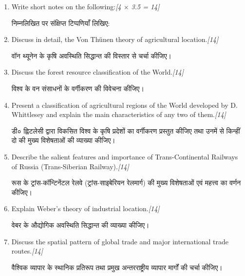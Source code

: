 \documentclass[11pt,a4paper]{article}
\newcommand{\pts}[1]{\hfill \textit{[#1]}}
\begin{document}
\begin{enumerate}[label=\textbf{\arabic*.},leftmargin=*,itemsep=14pt]

  \item Write short notes on the following:\pts{4 $\times$ 3.5 = 14}
  
  निम्नलिखित पर संक्षिप्त टिप्पणियाँ लिखिए:

  \item Discuss in detail, the Von Thünen theory of agricultural location.\pts{14}
  
  वॉन थ्यूनेन के कृषि अवस्थिति सिद्धान्त की विस्तार से चर्चा कीजिए।

  \item Discuss the forest resource classification of the World.\pts{14}
  
  विश्व के वन संसाधनों के वर्गीकरण की विवेचना कीजिए।

  \item Present a classification of agricultural regions of the World developed by D. Whittlesey and explain the main characteristics of any two of them.\pts{14}
  
  डी० ह्विटलेसी द्वारा विकसित विश्व के कृषि प्रदेशों का वर्गीकरण प्रस्तुत कीजिए तथा उनमें से किन्हीं दो की मुख्य विशेषताओं की व्याख्या कीजिए।

  \item Describe the salient features and importance of Trans-Continental Railways of Russia (Trans-Siberian Railway).\pts{14}
  
  रूस के ट्रांस-कॉन्टिनेंटल रेलवे (ट्रांस-साइबेरियन रेलमार्ग) की मुख्य विशेषताओं एवं महत्त्व का वर्णन कीजिए।

  \item Explain Weber's theory of industrial location.\pts{14}
  
  वेबर के औद्योगिक अवस्थिति सिद्धान्त की व्याख्या कीजिए।

  \item Discuss the spatial pattern of global trade and major international trade routes.\pts{14}
  
  वैश्विक व्यापार के स्थानिक प्रतिरूप तथा प्रमुख अन्तरराष्ट्रीय व्यापार मार्गों की चर्चा कीजिए।

\end{enumerate}
\end{document}
